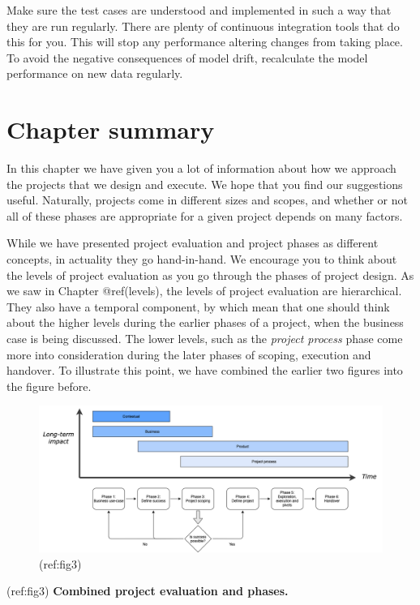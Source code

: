 \documentclass[]{book}
\begin{document}
Make sure the test cases are understood and implemented in such a way
that they are run regularly. There are plenty of continuous integration
tools that do this for you. This will stop any performance altering
changes from taking place. To avoid the negative consequences of model
drift, recalculate the model performance on new data regularly.

\hypertarget{chapter-summary}{%
\section{Chapter summary}\label{chapter-summary}}

In this chapter we have given you a lot of information about how we
approach the projects that we design and execute. We hope that you find
our suggestions useful. Naturally, projects come in different sizes and
scopes, and whether or not all of these phases are appropriate for a
given project depends on many factors.

While we have presented project evaluation and project phases as
different concepts, in actuality they go hand-in-hand. We encourage you
to think about the levels of project evaluation as you go through the
phases of project design. As we saw in Chapter @ref(levels), the levels
of project evaluation are hierarchical. They also have a temporal
component, by which mean that one should think about the higher levels
during the earlier phases of a project, when the business case is being
discussed. The lower levels, such as the \emph{project process} phase
come more into consideration during the later phases of scoping,
execution and handover. To illustrate this point, we have combined the
earlier two figures into the figure before.

\begin{smaller}

\begin{figure}
\includegraphics[width=1\linewidth]{figures/Framework phases} \caption{(ref:fig3)}\label{fig:full-figure}
\end{figure}

(ref:fig3) \textbf{Combined project evaluation and phases.}

\end{smaller}
\end{document}
